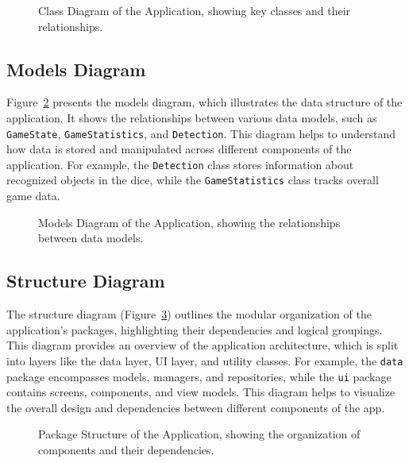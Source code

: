 \begin{figure}[ht!]
    \centering
    
    \caption{Class Diagram of the Application, showing key classes and their relationships.}
    \label{fig:class_diagram}
\end{figure}

\subsection{Models Diagram}  
Figure~\ref{fig:models_diagram} presents the models diagram, which illustrates the data structure of the application. It shows the relationships between various data models, such as \texttt{GameState}, \texttt{GameStatistics}, and \texttt{Detection}. This diagram helps to understand how data is stored and manipulated across different components of the application. For example, the \texttt{Detection} class stores information about recognized objects in the dice, while the \texttt{GameStatistics} class tracks overall game data.

\begin{figure}[ht!]
    \centering
    
    \caption{Models Diagram of the Application, showing the relationships between data models.}
    \label{fig:models_diagram}
\end{figure}

\subsection{Structure Diagram}  
The structure diagram (Figure~\ref{fig:package_structure}) outlines the modular organization of the application's packages, highlighting their dependencies and logical groupings. This diagram provides an overview of the application architecture, which is split into layers like the data layer, UI layer, and utility classes. For example, the \texttt{data} package encompasses models, managers, and repositories, while the \texttt{ui} package contains screens, components, and view models. This diagram helps to visualize the overall design and dependencies between different components of the app.

\begin{figure}[ht!]
    \centering
    
    \caption{Package Structure of the Application, showing the organization of components and their dependencies.}
    \label{fig:package_structure}
\end{figure}


